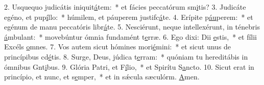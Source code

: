 2. Usquequo judicátis iniquit\uline{á}tem:~* et fácies peccatórum sm\uline{i}tis?
3. Judicáte egéno, et pup\uline{í}llo:~* húmilem, et páuperem justifc\uline{á}te.
4. Erípite p\uline{áu}perem:~* et egénum de manu peccatóris libr\uline{á}te.
5. Nesciérunt, neque intellexérunt, in ténebris \uline{á}mbulant:~* movebúntur ómnia fundamént t\uline{e}rræ.
6. Ego dixi: Dii \uline{e}stis,~* et fílii Excéls \uline{o}mnes.
7. Vos autem sicut hómines mori\uline{é}mini:~* et sicut unus de princípibus cd\uline{é}tis.
8. Surge, Deus, júdica t\uline{e}rram:~* quóniam tu hereditábis in ómnibus Gnt\uline{i}bus.
9. Glória Patri, et F\uline{í}lio,~* et Spirítu S\uline{a}ncto.
10. Sicut erat in princípio, et nunc, et s\uline{e}mper,~* et in sǽcula sæculórm. \uline{A}men.

